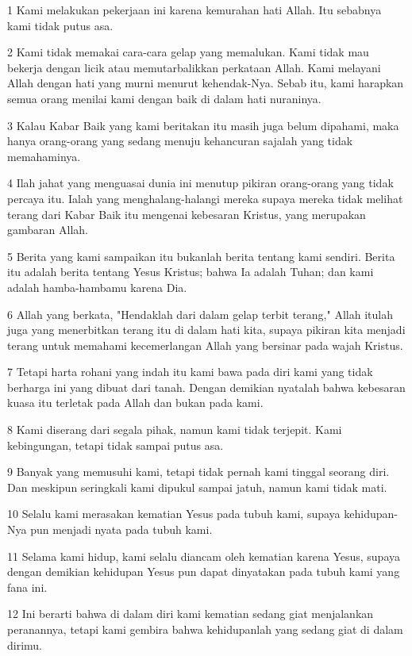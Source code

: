 \par 1 Kami melakukan pekerjaan ini karena kemurahan hati Allah. Itu sebabnya kami tidak putus asa.
\par 2 Kami tidak memakai cara-cara gelap yang memalukan. Kami tidak mau bekerja dengan licik atau memutarbalikkan perkataan Allah. Kami melayani Allah dengan hati yang murni menurut kehendak-Nya. Sebab itu, kami harapkan semua orang menilai kami dengan baik di dalam hati nuraninya.
\par 3 Kalau Kabar Baik yang kami beritakan itu masih juga belum dipahami, maka hanya orang-orang yang sedang menuju kehancuran sajalah yang tidak memahaminya.
\par 4 Ilah jahat yang menguasai dunia ini menutup pikiran orang-orang yang tidak percaya itu. Ialah yang menghalang-halangi mereka supaya mereka tidak melihat terang dari Kabar Baik itu mengenai kebesaran Kristus, yang merupakan gambaran Allah.
\par 5 Berita yang kami sampaikan itu bukanlah berita tentang kami sendiri. Berita itu adalah berita tentang Yesus Kristus; bahwa Ia adalah Tuhan; dan kami adalah hamba-hambamu karena Dia.
\par 6 Allah yang berkata, "Hendaklah dari dalam gelap terbit terang," Allah itulah juga yang menerbitkan terang itu di dalam hati kita, supaya pikiran kita menjadi terang untuk memahami kecemerlangan Allah yang bersinar pada wajah Kristus.
\par 7 Tetapi harta rohani yang indah itu kami bawa pada diri kami yang tidak berharga ini yang dibuat dari tanah. Dengan demikian nyatalah bahwa kebesaran kuasa itu terletak pada Allah dan bukan pada kami.
\par 8 Kami diserang dari segala pihak, namun kami tidak terjepit. Kami kebingungan, tetapi tidak sampai putus asa.
\par 9 Banyak yang memusuhi kami, tetapi tidak pernah kami tinggal seorang diri. Dan meskipun seringkali kami dipukul sampai jatuh, namun kami tidak mati.
\par 10 Selalu kami merasakan kematian Yesus pada tubuh kami, supaya kehidupan-Nya pun menjadi nyata pada tubuh kami.
\par 11 Selama kami hidup, kami selalu diancam oleh kematian karena Yesus, supaya dengan demikian kehidupan Yesus pun dapat dinyatakan pada tubuh kami yang fana ini.
\par 12 Ini berarti bahwa di dalam diri kami kematian sedang giat menjalankan peranannya, tetapi kami gembira bahwa kehidupanlah yang sedang giat di dalam dirimu.
